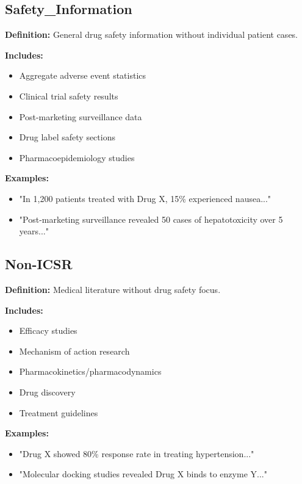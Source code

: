 \subsection{Safety\_Information}

\textbf{Definition:}
General drug safety information without individual patient cases.

\textbf{Includes:}
\begin{itemize}
    \item Aggregate adverse event statistics
    \item Clinical trial safety results
    \item Post-marketing surveillance data
    \item Drug label safety sections
    \item Pharmacoepidemiology studies
\end{itemize}

\textbf{Examples:}
\begin{itemize}
    \item "In 1,200 patients treated with Drug X, 15\% experienced nausea..."
    \item "Post-marketing surveillance revealed 50 cases of hepatotoxicity over 5 years..."
\end{itemize}

\subsection{Non-ICSR}

\textbf{Definition:}
Medical literature without drug safety focus.

\textbf{Includes:}
\begin{itemize}
    \item Efficacy studies
    \item Mechanism of action research
    \item Pharmacokinetics/pharmacodynamics
    \item Drug discovery
    \item Treatment guidelines
\end{itemize}

\textbf{Examples:}
\begin{itemize}
    \item "Drug X showed 80\% response rate in treating hypertension..."
    \item "Molecular docking studies revealed Drug X binds to enzyme Y..."
\end{itemize}

